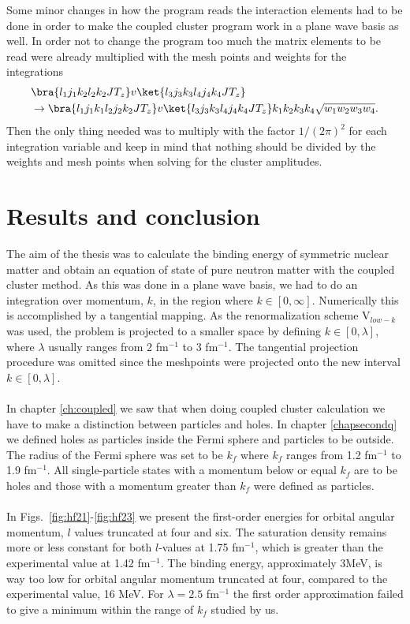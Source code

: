 Some minor changes in how the program reads the interaction elements 
had to be done in order  to make the coupled cluster program work in a plane wave basis as well. 
In order not to change  the program too much the matrix elements to be read were already multiplied with the mesh points and weights for the integrations
\begin{equation*}
		\begin{split}
             &\bra{l_1j_1k_2l_2k_2JT_z}v\ket{l_3j_3k_3l_4j_4k_4JT_z}\\
             & \rightarrow \bra{l_1j_1k_1l_2j_2k_2JT_z}v\ket{l_3j_3k_3l_4j_4k_4JT_z}k_1k_2k_3k_4\sqrt{w_1w_2w_3w_4}.
        \end{split}
\end{equation*}
Then the only thing needed was to multiply with the factor $1/(2\pi)^2$  for
each integration variable and keep in mind that nothing should be divided by
the weights and mesh points when solving for the cluster amplitudes. 

\clearpage


\section{Results and conclusion}

The aim of the thesis was to calculate the binding energy of symmetric nuclear
matter and obtain an equation of state of pure neutron matter with the coupled
cluster method. As this was done in a plane wave basis, we had to do an
integration over momentum, $k$, in the region where $k\in[0,\infty]$.
Numerically this is accomplished by a tangential mapping. As the
renormalization scheme V$_{low-k}$ was used, the problem is projected to
a smaller space by defining $k\in[0,\lambda]$, where $\lambda$ usually ranges from 2
fm$^{-1}$ to 3 fm$^{-1}$. The tangential projection procedure was omitted since
the meshpoints were projected onto the new interval $k\in[0,\lambda]$.\\
\\
In chapter \ref{ch:coupled} we saw that when doing coupled cluster calculation
we have to make a distinction between particles and holes. In chapter
\ref{chapsecondq} we defined holes as particles inside the Fermi sphere and
particles to be outside. The radius of the Fermi sphere was set to be $k_f$
where $k_f$ ranges from 1.2 fm$^{-1}$ to 1.9 fm$^{-1}$. All single-particle
states with a momentum below or equal $k_f$ are to be holes and those with a
momentum greater than $k_f$ were defined as particles.\\
\\
In Figs.~\ref{fig:hf21}-\ref{fig:hf23} we present the first-order energies for orbital angular momentum, $l$ values
truncated at four and six.  The saturation density remains more or less constant
for both $l$-values at 1.75 fm$^{-1}$, which is greater than the experimental
value at 1.42 fm$^{-1}$. The binding energy, approximately $3$MeV, is way too low for orbital angular momentum
truncated at four, compared to the experimental value, 16 MeV. For $\lambda=2.5$
fm$^{-1}$ the first order approximation failed to give a minimum within the range of $k_f$ studied by us.

